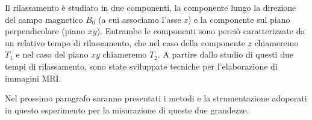 Il rilassamento è studiato in due componenti, la componente lungo la direzione del campo magnetico $B_0$ (a cui associamo l'asse $z$) e la componente sul piano perpendicolare (piano $xy$). 
Entrambe le componenti sono perciò caratterizzate da un relativo tempo di rilassamento, che nel caso della componente $z$ chiameremo $T_1$ e nel caso del piano $xy$ chiameremo $T_2$.
A partire dallo studio di questi due tempi di rilassamento, sono state sviluppate tecniche per l'elaborazione di immagini MRI.

Nel prossimo paragrafo saranno presentati i metodi e la strumentazione adoperati in questo esperimento per la misurazione di queste due grandezze.
